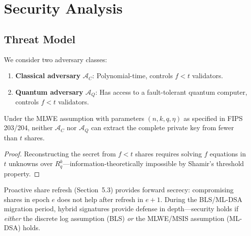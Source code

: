 \section{Security Analysis}


\subsection{Threat Model}

We consider two adversary classes:

\begin{enumerate}
\item \textbf{Classical adversary} $\mathcal{A}_C$: Polynomial-time, controls $f < t$ validators.
\item \textbf{Quantum adversary} $\mathcal{A}_Q$: Has access to a fault-tolerant quantum computer, controls $f < t$ validators.
\end{enumerate}

\begin{theorem}
Under the MLWE assumption with parameters $(n, k, q, \eta)$ as specified in FIPS 203/204, neither $\mathcal{A}_C$ nor $\mathcal{A}_Q$ can extract the complete private key from fewer than $t$ shares.
\end{theorem}

\begin{proof}
Reconstructing the secret from $f < t$ shares requires solving $f$ equations in $t$ unknowns over $R_q^k$---information-theoretically impossible by Shamir's threshold property.
\end{proof}

Proactive share refresh (Section~5.3) provides forward secrecy: compromising shares in epoch $e$ does not help after refresh in $e+1$. During the BLS/ML-DSA migration period, hybrid signatures provide defense in depth---security holds if \emph{either} the discrete log assumption (BLS) \emph{or} the MLWE/MSIS assumption (ML-DSA) holds.

